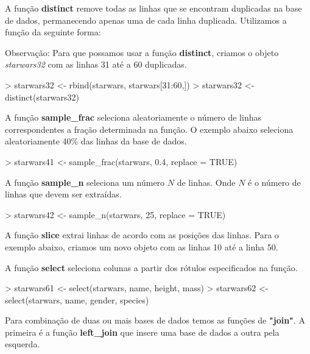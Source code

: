 \documentclass[12pt,a4paper,oneside]{erdc}
\begin{document}
A função \textbf{distinct} remove todas as linhas que se encontram duplicadas na base de dados, permanecendo apenas uma de cada linha duplicada. Utilizamos a função da seguinte forma:

Observação: Para que possamos usar a função \textbf{distinct}, criamos o objeto \emph{starwars32} com as linhas 31 até a 60 duplicadas.

\begin{Schunk}
\begin{Sinput}
> starwars32 <- rbind(starwars, starwars[31:60,])
> starwars32 <- distinct(starwars32)
\end{Sinput}
\end{Schunk}

A função \textbf{sample\_frac} seleciona aleatoriamente o número de linhas correspondentes a fração determinada na função. O exemplo abaixo seleciona aleatoriamente 40\% das linhas da base de dados.

\begin{Schunk}
\begin{Sinput}
> starwars41 <- sample_frac(starwars, 0.4, replace = TRUE)
\end{Sinput}
\end{Schunk}

A função \textbf{sample\_n} seleciona um número $N$ de linhas. Onde $N$ é o número de linhas que devem ser extraídas.
\begin{Schunk}
\begin{Sinput}
> starwars42 <- sample_n(starwars, 25, replace = TRUE)
\end{Sinput}
\end{Schunk}

A função \textbf{slice} extrai linhas de acordo com as posições das linhas. Para o exemplo abaixo, criamos um novo objeto com as linhas 10 até a linha 50.


A função \textbf{select} seleciona colunas a partir dos rótulos especificados na função.

\begin{Schunk}
\begin{Sinput}
> starwars61 <- select(starwars, name, height, mass)
> starwars62 <- select(starwars, name, gender, species)
\end{Sinput}
\end{Schunk}

Para combinação de duas ou mais bases de dados temos as funções de \textbf{"join"}. A primeira é a função \textbf{left\_join} que insere uma base de dados a outra pela esquerda. 
\end{document}

